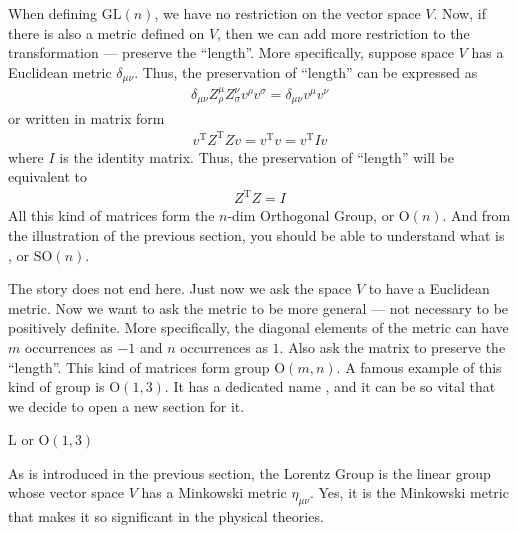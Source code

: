 \documentclass[letterpaper,10pt,english]{sphinxmanual}
\begin{document}
When defining \(\mathrm{GL}(n)\), we have no restriction on the vector space \(V\). Now, if there is also a metric defined on \(V\), then we can add more restriction to the transformation --- preserve the ``length''. More specifically, suppose space \(V\) has a Euclidean metric \(\delta_{\mu\nu}\). Thus, the preservation of ``length'' can be expressed as
\begin{equation*}
\begin{split}\delta_{\mu\nu}Z^\mu_\rho Z^\nu_\sigma v^\rho v^\sigma = \delta_{\mu\nu}v^\mu v^\nu\end{split}
\end{equation*}
or written in matrix form
\begin{equation*}
\begin{split}v^{\mathrm{T}}Z^{\mathrm{T}}Zv = v^{\mathrm{T}} v = v^{\mathrm{T}}Iv\end{split}
\end{equation*}
where \(I\) is the identity matrix. Thus, the preservation of ``length'' will be equivalent to
\begin{equation*}
\begin{split}Z^{\mathrm{T}}Z = I\end{split}
\end{equation*}
All this kind of matrices form the \(n\)-dim Orthogonal Group, or \(\mathrm{O}(n)\). And from the illustration of the previous section, you should be able to understand what is , or \(\mathrm{SO}(n)\).

The story does not end here. Just now we ask the space \(V\) to have a Euclidean metric. Now we want to ask the metric to be more general --- not necessary to be positively definite. More specifically, the diagonal elements of the metric can have \(m\) occurrences as \(-1\) and \(n\) occurrences as \(1\). Also ask the matrix to preserve the ``length''. This kind of matrices form group \(\mathrm{O}(m,n)\). A famous example of this kind of group is \(\mathrm{O}(1,3)\). It has a dedicated name , and it can be so vital that we decide to open a new section for it.

 \(\mathrm{L}\) or \(\mathrm{O}(1,3)\)

As is introduced in the previous section, the Lorentz Group is the linear group whose vector space \(V\) has a Minkowski metric \(\eta_{\mu\nu}\). Yes, it is the Minkowski metric that makes it so significant in the physical theories.
\end{document}
